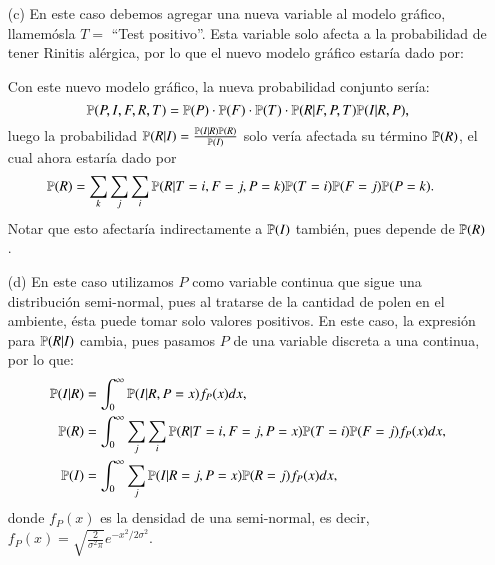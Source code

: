 \documentclass[
	spanish, %
	letterpaper, oneside
]{article}
\begin{document}
\begin{enumerate}
\item[(c)] En este caso debemos agregar una nueva variable al modelo gráfico, llamemósla \(T=\) ``Test positivo''. Esta variable solo afecta a la probabilidad de tener Rinitis alérgica, por lo que el nuevo modelo gráfico estaría dado por:
\begin{center}\end{center}
Con este nuevo modelo gráfico, la nueva probabilidad conjunto sería:
\[\P(P,I,F,R,T)=\P(P)\cdot\P(F)\cdot\P(T)\cdot\P(R|F,P,T)\P(I|R,P),\]
luego la probabilidad \(\P(R|I)=\frac{\P(I|R)\P(R)}{\P(I)}\) solo vería afectada su término \(\P(R)\), el cual ahora estaría dado por
\begin{align*}
	\P(R)&=\sum_{k}\sum_{j}\sum_i\P(R|T=i,F=j,P=k)\P(T=i)\P(F=j)\P(P=k).
\end{align*}
Notar que esto afectaría indirectamente a \(\P(I)\) también, pues depende de \(\P(R)\).

\item[(d)] En este caso utilizamos \(P\) como variable continua que sigue una distribución semi-normal, pues al tratarse de la cantidad de polen en el ambiente, ésta puede tomar solo valores positivos. En este caso, la expresión para \(\P(R|I)\) cambia, pues pasamos \(P\) de una variable discreta a una continua, por lo que:
\begin{align*}
	\P(I|R)&=\int_0^\infty\P(I|R,P=x)f_P(x)dx,\\
	\P(R)&=\int_0^\infty\sum_{j}\sum_i\P(R|T=i,F=j,P=x)\P(T=i)\P(F=j)f_P(x)dx,\\
	\P(I)&=\int_0^\infty\sum_{j}\P(I|R=j,P=x)\P(R=j)f_P(x)dx,
\end{align*}
donde \(f_P(x)\) es la densidad de una semi-normal, es decir, \(f_P(x)=\sqrt{\frac{2}{\sigma^2\pi}}e^{-x^2/2\sigma^2}\).


\end{enumerate}
\end{document}
